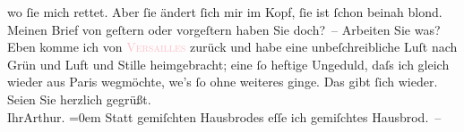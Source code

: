                    wo  ſie mich {\pb}rettet. Aber ſie ändert ſich mir im Kopf, ſie ist ſchon beinah blond.\pend
           \pstart
           Meinen Brief von geſtern oder vorgeſtern haben Sie doch? –\pend
           \pstart
           Arbeiten Sie was?\pend
           \pstart
           Eben komme ich von \textcolor{pink}{\textsc{Versailles}}{}\ledrightnote{\textcolor{pink}{Versailles}} zurück und habe eine unbeſchreibliche Luſt nach Grün und Luft und Stille
                        heimge{\pb}bracht; eine ſo heftige Ungeduld, daſs ich
                    gleich wieder aus Paris wegmöchte, we{\geminationn}’s ſo ohne
                    weiteres ginge.\pend
           \pstart
           Das gibt ſich wieder.\pend
           \pstart
           Seien Sie herzlich gegrüßt.{\\[\baselineskip]}Ihr\spacefill\mbox{Arthur.}\pend
           \leftskip=0em{}\pstart
           \noindent{}Statt gemiſchten Hausbrodes eſſe ich gemiſchtes Hausbrod. –\pend
           \endnumbering{}  
      